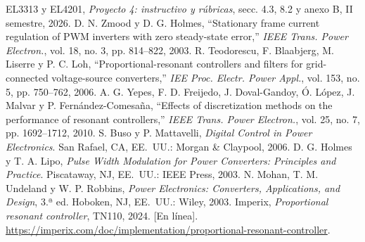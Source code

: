 \usepackage[utf8]{inputenc}
\usepackage[T1]{fontenc}
\usepackage[spanish,es-tabla]{babel}
\spanishplainpercent
\usepackage{amsmath,amssymb,booktabs,array,url,graphicx,xcolor}
\usepackage{float,cuted,capt-of}
\setlength{\intextsep}{8pt plus 2pt minus 2pt}
\setlength{\stripsep}{8pt plus 2pt minus 2pt}
\usepackage[siunitx]{circuitikz}
\usetikzlibrary{arrows.meta,positioning}
\usepackage[hidelinks]{hyperref}
\graphicspath{{figuras/}}
\renewcommand{\IEEEkeywordsname}{Palabras clave}
\pagestyle{plain}
\raggedbottom
\newcommand{\autores}{\author{\IEEEauthorblockN{Kevin Aguilar, Kenneth Campos y Kevin Cortés}
\IEEEauthorblockA{Escuela de Ingeniería Electrónica\\Instituto Tecnológico de Costa Rica\\
EL4201 Procesamiento Electrónico de Potencia}}}
\expandafter\def\csname fuenteenunciado\endcsname{EL3313 y EL4201, \textit{Proyecto 4: instructivo y rúbricas}, secc. 4.3, 8.2 y anexo B, II semestre, 2026.}
\expandafter\def\csname fuentezmood\endcsname{D. N. Zmood y D. G. Holmes, ``Stationary frame current regulation of PWM inverters with zero steady-state error,'' \textit{IEEE Trans. Power Electron.}, vol. 18, no. 3, pp. 814--822, 2003.}
\expandafter\def\csname fuenteteodorescu\endcsname{R. Teodorescu, F. Blaabjerg, M. Liserre y P. C. Loh, ``Proportional-resonant controllers and filters for grid-connected voltage-source converters,'' \textit{IEE Proc. Electr. Power Appl.}, vol. 153, no. 5, pp. 750--762, 2006.}
\expandafter\def\csname fuenteyepes\endcsname{A. G. Yepes, F. D. Freijedo, J. Doval-Gandoy, Ó. López, J. Malvar y P. Fernández-Comesaña, ``Effects of discretization methods on the performance of resonant controllers,'' \textit{IEEE Trans. Power Electron.}, vol. 25, no. 7, pp. 1692--1712, 2010.}
\expandafter\def\csname fuentebuso\endcsname{S. Buso y P. Mattavelli, \textit{Digital Control in Power Electronics}. San Rafael, CA, EE.~UU.: Morgan \& Claypool, 2006.}
\expandafter\def\csname fuenteholmes\endcsname{D. G. Holmes y T. A. Lipo, \textit{Pulse Width Modulation for Power Converters: Principles and Practice}. Piscataway, NJ, EE.~UU.: IEEE Press, 2003.}
\expandafter\def\csname fuentemohan\endcsname{N. Mohan, T. M. Undeland y W. P. Robbins, \textit{Power Electronics: Converters, Applications, and Design}, 3.ª ed. Hoboken, NJ, EE.~UU.: Wiley, 2003.}
\expandafter\def\csname fuentepr\endcsname{Imperix, \textit{Proportional resonant controller}, TN110, 2024. [En línea]. \url{https://imperix.com/doc/implementation/proportional-resonant-controller}.}
